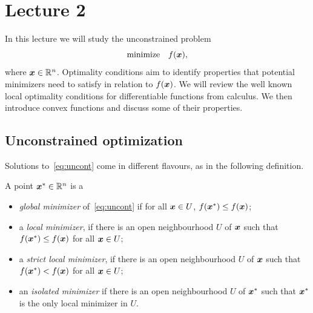 %
%
% 


\chapter*{Lecture 2}
\addtocounter{chapter}{2}


In this lecture we will study the unconstrained problem
\begin{equation}\label{eq:uncont}
 \text{minimize}\quad f(\bm{x}),
\end{equation}
where $\bm{x}\in \mathbb{R}^n$. Optimality conditions aim to identify properties that potential minimizers need to satisfy in relation to $f(\bm{x})$. We will review the well known local optimality conditions for differentiable functions from calculus. We then introduce convex functions and discuss some of their properties.

\section{Unconstrained optimization}
Solutions to~\eqref{eq:uncont} come in different flavours, as in the following definition.

\begin{definition}
A point $\bm{x}^*\in \mathbb{R}^n$ is a
\begin{itemize}
 \item  {\em global minimizer} of~\eqref{eq:uncont} if for all $\bm{x}\in U$, $f(\bm{x}^*)\leq f(\bm{x})$;
 \item a {\em local minimizer}, if there is an open neighbourhood $U$ of $\bm{x}$ such that $f(\bm{x}^*)\leq f(\bm{x})$ for all $\bm{x}\in U$;
 \item a {\em strict local minimizer}, if there is an open neighbourhood $U$ of $\bm{x}$ such that $f(\bm{x}^*)<f(\bm{x})$ for all $\bm{x}\in U$;
 \item an {\em isolated minimizer} if there is an open neighbourhood $U$ of $\bm{x}^*$ such that $\bm{x}^*$ is the only local minimizer in $U$.
 \end{itemize}
\end{definition}

